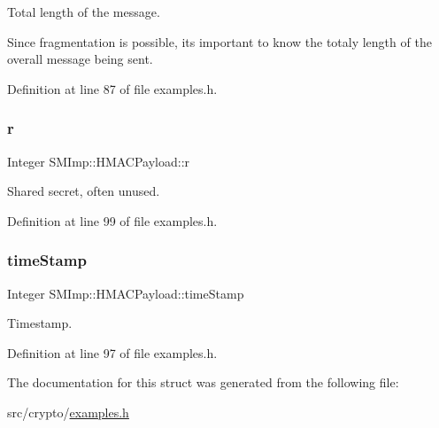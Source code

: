 Total length of the message. 

Since fragmentation is possible, it\textquotesingle{}s important to know the totaly length of the overall message being sent. 

Definition at line 87 of file examples.\+h.

\mbox{\label{structSMImp_1_1HMACPayload_a6829ee16dbd13177fdbca12b6e52a75b}} 
\subsubsection{\texorpdfstring{r}{r}}
{\footnotesize\ttfamily Integer S\+M\+Imp\+::\+H\+M\+A\+C\+Payload\+::r}



Shared secret, often unused. 



Definition at line 99 of file examples.\+h.

\mbox{\label{structSMImp_1_1HMACPayload_abf2b3077546fcf168ee7e0fe80a08b40}} 
\subsubsection{\texorpdfstring{time\+Stamp}{timeStamp}}
{\footnotesize\ttfamily Integer S\+M\+Imp\+::\+H\+M\+A\+C\+Payload\+::time\+Stamp}



Timestamp. 



Definition at line 97 of file examples.\+h.



The documentation for this struct was generated from the following file\+:\begin{DoxyCompactItemize}
\item 
src/crypto/\hyperlink{examples_8h}{examples.\+h}\end{DoxyCompactItemize}
